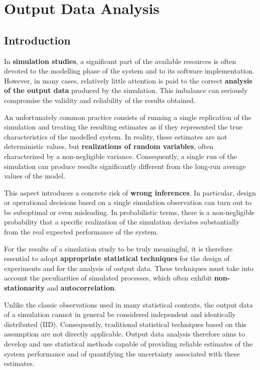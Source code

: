 \chapter{Output Data Analysis}

\section{Introduction}

In \textbf{simulation studies}, a significant part of the available resources is often devoted to the modelling phase of the system and to its software implementation. However, in many cases, relatively little attention is paid to the correct \textbf{analysis of the output data} produced by the simulation. This imbalance can seriously compromise the validity and reliability of the results obtained.

An unfortunately common practice consists of running a single replication of the simulation and treating the resulting estimates as if they represented the true characteristics of the modelled system. In reality, these estimates are not deterministic values, but \textbf{realizations of random variables}, often characterized by a non-negligible variance. Consequently, a single run of the simulation can produce results significantly different from the long-run average values of the model.

This aspect introduces a concrete risk of \textbf{wrong inferences}. In particular, design or operational decisions based on a single simulation observation can turn out to be suboptimal or even misleading. In probabilistic terms, there is a non-negligible probability that a specific realization of the simulation deviates substantially from the real expected performance of the system.

For the results of a simulation study to be truly meaningful, it is therefore essential to adopt \textbf{appropriate statistical techniques} for the design of experiments and for the analysis of output data. These techniques must take into account the peculiarities of simulated processes, which often exhibit \textbf{non-stationarity} and \textbf{autocorrelation}.

Unlike the classic observations used in many statistical contexts, the output data of a simulation cannot in general be considered independent and identically distributed (IID). Consequently, traditional statistical techniques based on this assumption are not directly applicable. Output data analysis therefore aims to develop and use statistical methods capable of providing reliable estimates of the system performance and of quantifying the uncertainty associated with these estimates.

